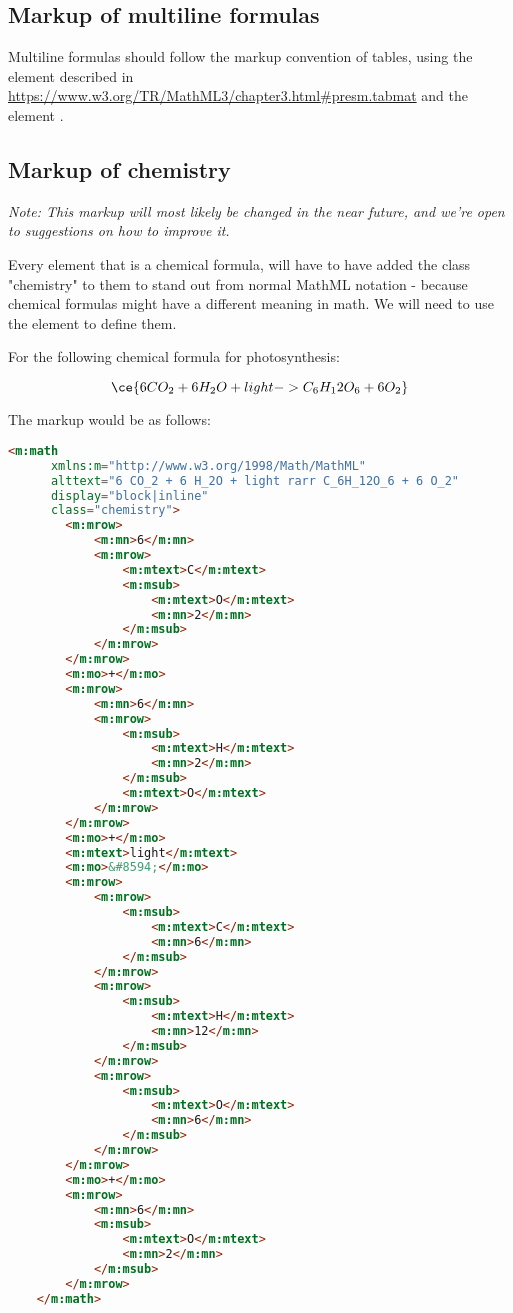 \documentclass[english,a4paper,11pt]{article}
\begin{document}
\subsection{Markup of multiline formulas}

Multiline formulas should follow the markup convention of tables, using the  element described in \url{https://www.w3.org/TR/MathML3/chapter3.html#presm.tabmat} and the element .

\subsection{Markup of chemistry}\label{chemistry}

\textit{Note: This markup will most likely be changed in the near future, and we're open to suggestions on how to improve it.}

Every  element that is a chemical formula, will have to have added the class "chemistry" to them to stand out from normal MathML notation - because chemical formulas might have a different meaning in math. We will need to use the  element to define them. 

For the following chemical formula for photosynthesis:

\begin{eksempler}
\begin{equation}
    \ce{6 CO_2 + 6 H_2O + light -> C_6H_12O_6 + 6 O_2}
\end{equation}

The markup would be as follows:
\begin{lstlisting}[language=HTML]
	<m:math 
	  xmlns:m="http://www.w3.org/1998/Math/MathML"
	  alttext="6 CO_2 + 6 H_2O + light rarr C_6H_12O_6 + 6 O_2"
	  display="block|inline"
	  class="chemistry">
		<m:mrow>
			<m:mn>6</m:mn>
			<m:mrow>
				<m:mtext>C</m:mtext>
				<m:msub>
					<m:mtext>O</m:mtext>
					<m:mn>2</m:mn>
				</m:msub>
			</m:mrow>
		</m:mrow>
		<m:mo>+</m:mo>
		<m:mrow>
			<m:mn>6</m:mn>
			<m:mrow>
				<m:msub>
					<m:mtext>H</m:mtext>
					<m:mn>2</m:mn>
				</m:msub>
				<m:mtext>O</m:mtext>
			</m:mrow>
		</m:mrow>
		<m:mo>+</m:mo>
		<m:mtext>light</m:mtext>
		<m:mo>&#8594;</m:mo>
		<m:mrow>
			<m:mrow>
				<m:msub>
					<m:mtext>C</m:mtext>
					<m:mn>6</m:mn>
				</m:msub>
			</m:mrow>
			<m:mrow>
				<m:msub>
					<m:mtext>H</m:mtext>
					<m:mn>12</m:mn>
				</m:msub>
			</m:mrow>
			<m:mrow>
				<m:msub>
					<m:mtext>O</m:mtext>
					<m:mn>6</m:mn>
				</m:msub>
			</m:mrow>
		</m:mrow>
		<m:mo>+</m:mo>
		<m:mrow>
			<m:mn>6</m:mn>
			<m:msub>
				<m:mtext>O</m:mtext>
				<m:mn>2</m:mn>
			</m:msub>
		</m:mrow>
	</m:math>
\end{lstlisting}
\end{eksempler}
\end{document}
